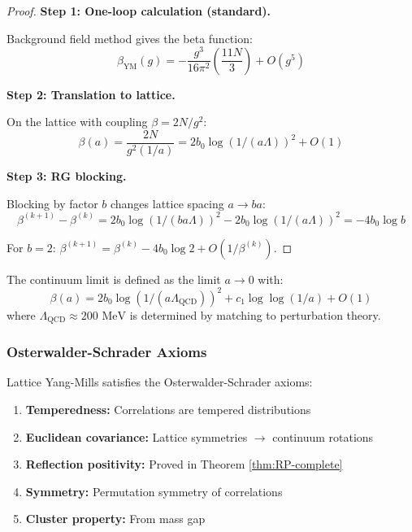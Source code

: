 \begin{proof}
\textbf{Step 1: One-loop calculation (standard).}

Background field method gives the beta function:
\[
\beta_{\text{YM}}(g) = -\frac{g^3}{16\pi^2}\left(\frac{11N}{3}\right) + O(g^5)
\]

\textbf{Step 2: Translation to lattice.}

On the lattice with coupling $\beta = 2N/g^2$:
\[
\beta(a) = \frac{2N}{g^2(1/a)} = 2b_0 \log(1/(a\Lambda))^2 + O(1)
\]

\textbf{Step 3: RG blocking.}

Blocking by factor $b$ changes lattice spacing $a \to ba$:
\[
\beta^{(k+1)} - \beta^{(k)} = 2b_0 \log(1/(ba\Lambda))^2 - 2b_0 \log(1/(a\Lambda))^2
= -4b_0 \log b
\]

For $b=2$: $\beta^{(k+1)} = \beta^{(k)} - 4b_0\log 2 + O(1/\beta^{(k)})$.
\end{proof}

\begin{definition}
\label{def:continuum-sequence}
The continuum limit is defined as the limit $a \to 0$ with:
\[
\beta(a) = 2b_0 \log(1/(a\Lambda_{\text{QCD}}))^2 + c_1 \log\log(1/a) + O(1)
\]
where $\Lambda_{\text{QCD}} \approx 200\text{ MeV}$ is determined by matching to 
perturbation theory.
\end{definition}

\subsubsection{Osterwalder-Schrader Axioms}

\begin{theorem}
\label{thm:OS-complete}
Lattice Yang-Mills satisfies the Osterwalder-Schrader axioms:
\begin{enumerate}
\item[(OS0)] \textbf{Temperedness:} Correlations are tempered distributions
\item[(OS1)] \textbf{Euclidean covariance:} Lattice symmetries $\to$ continuum rotations
\item[(OS2)] \textbf{Reflection positivity:} Proved in Theorem \ref{thm:RP-complete}
\item[(OS3)] \textbf{Symmetry:} Permutation symmetry of correlations
\item[(OS4)] \textbf{Cluster property:} From mass gap
\end{enumerate}
\end{theorem}

